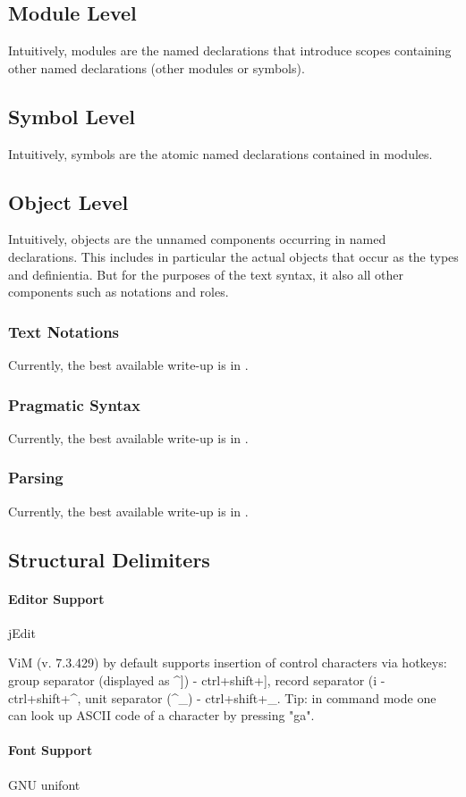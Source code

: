 \subsection{Module Level}

Intuitively, modules are the named declarations that introduce scopes containing other named declarations (other modules or symbols).

\subsection{Symbol Level}

Intuitively, symbols are the atomic named declarations contained in modules.

\subsection{Object Level}

Intuitively, objects are the unnamed components occurring in named declarations.
This includes in particular the actual {\mmt} objects that occur as the types and definientia.
But for the purposes of the text syntax, it also all other components such as notations and roles.

\subsubsection{Text Notations}

Currently, the best available write-up is in \cite{GIR:mmtlatex:13}.

\subsubsection{Pragmatic Syntax}

Currently, the best available write-up is in \cite{GIR:mmtlatex:13}.

\subsubsection{Parsing}

Currently, the best available write-up is in \cite{GIR:mmtlatex:13}.

\subsection{Structural Delimiters}

\paragraph{Editor Support}

jEdit

ViM (v. 7.3.429) by default supports insertion of control characters via hotkeys: group separator (displayed as ^]) - ctrl+shift+], record separator (^^) - ctrl+shift+^, unit separator (^_) - ctrl+shift+_. Tip: in command mode one can look up ASCII code of a character by pressing "ga".


\paragraph{Font Support}

GNU unifont
